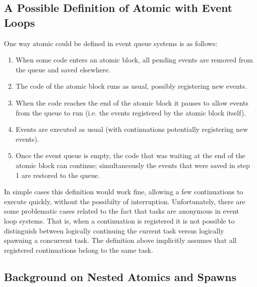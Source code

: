 \documentclass[acmsmall,anonymous,review]{acmart}\settopmatter{printfolios=true,printccs=false,printacmref=false}
\begin{document}
\subsection{A Possible Definition of Atomic with Event Loops}

One way atomic could be defined in event queue systems is as follows:

\begin{enumerate}
\item When some code enters an atomic block, all pending events are removed from the queue and saved elsewhere.
\item The code of the atomic block runs as usual, possibly registering new events.
\item When the code reaches the end of the atomic block it pauses to allow events from the queue to run (i.e. the events registered by the atomic block itself).
\item Events are executed as usual (with continuations potentially registering new events).
\item Once the event queue is empty, the code that was waiting at the end of the atomic block can continue; simultaneously the events that were saved in step 1 are restored to the queue.
\end{enumerate}

In simple cases this definition would work fine, allowing a few continuations to execute quickly, without the possibilty of interruption.
Unfortunately, there are some problematic cases related to the fact that tasks are anonymous in event loop systems.
That is, when a continuation is registered it is not possible to distinguish between logically continuing the current task versus logically spawning a concurrent task.
The definition above implicitly assumes that all registered continuations belong to the same task.

\subsection{Background on Nested Atomics and Spawns}
\end{document}
